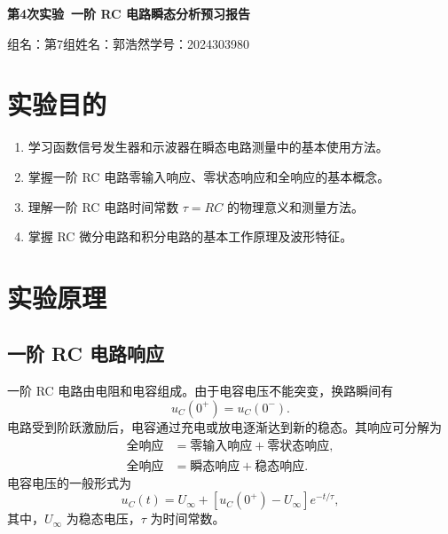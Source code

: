 \documentclass[12pt]{ctexart}
\begin{document}
\thispagestyle{empty}

\begin{center}
    \LARGE\textbf{第4次实验\ 一阶 RC 电路瞬态分析预习报告}

    \vspace{1cm}
    \normalsize
    组名：第7组\quad 姓名：郭浩然\quad 学号：2024303980
\end{center}

\vspace{1cm}


\section{实验目的}

\begin{enumerate}[label=\arabic*.]
    \item 学习函数信号发生器和示波器在瞬态电路测量中的基本使用方法。
    \item 掌握一阶 RC 电路零输入响应、零状态响应和全响应的基本概念。
    \item 理解一阶 RC 电路时间常数 \(\tau=RC\) 的物理意义和测量方法。
    \item 掌握 RC 微分电路和积分电路的基本工作原理及波形特征。
\end{enumerate}

\section{实验原理}

\subsection{一阶 RC 电路响应}

一阶 RC 电路由电阻和电容组成。由于电容电压不能突变，换路瞬间有
\begin{equation}
    u_C(0^+)=u_C(0^-).
\end{equation}
电路受到阶跃激励后，电容通过充电或放电逐渐达到新的稳态。其响应可分解为
\begin{align}
    \text{全响应} &= \text{零输入响应}+\text{零状态响应}, \\
    \text{全响应} &= \text{瞬态响应}+\text{稳态响应}.
\end{align}
电容电压的一般形式为
\begin{equation}
    u_C(t)=U_\infty+\left[u_C(0^+)-U_\infty\right]e^{-t/\tau},
    \label{eq:rc-general-response}
\end{equation}
其中，\(U_\infty\) 为稳态电压，\(\tau\) 为时间常数。
\end{document}
